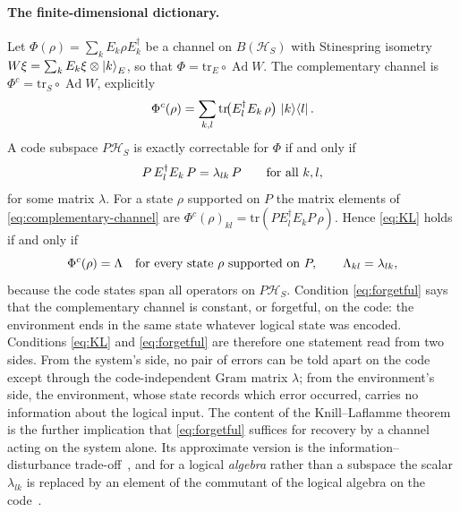 \documentclass[a4paper,11pt]{article}
\theoremstyle{definition}
\newcommand{\tr}{\text{tr}}
\newcommand{\Ad}{\operatorname{Ad}}
\begin{document}
\paragraph{The finite-dimensional dictionary.}
Let $\Phi(\rho)=\sum_kE_k\rho E_k^\dagger$ be a channel on $B(\mathcal H_S)$ with Stinespring isometry $W\xi=\sum_kE_k\xi\otimes\ket{k}_E$, so that $\Phi=\tr_E\circ\Ad W$. The complementary channel is $\Phi^c=\tr_S\circ\Ad W$, explicitly
\begin{equation}
 \Phi^c(\rho)=\sum_{k,l}\tr\!\bigl(E_l^\dagger E_k\,\rho\bigr)\,\ket{k}\!\bra{l}.
 \label{eq:complementary-channel}
\end{equation}
A code subspace $P\mathcal H_S$ is exactly correctable for $\Phi$ if and only if~\cite{KnillLaflamme1997}
\begin{equation}
 P\,E_l^\dagger E_k\,P=\lambda_{lk}\,P\qquad\hbox{for all }k,l,
 \label{eq:KL}
\end{equation}
for some matrix $\lambda$. For a state $\rho$ supported on $P$ the matrix elements of \eqref{eq:complementary-channel} are $\Phi^c(\rho)_{kl}=\tr(PE_l^\dagger E_kP\,\rho)$. Hence \eqref{eq:KL} holds if and only if
\begin{equation}
 \Phi^c(\rho)=\Lambda\quad\hbox{for every state $\rho$ supported on }P,\qquad\Lambda_{kl}=\lambda_{lk},
 \label{eq:forgetful}
\end{equation}
because the code states span all operators on $P\mathcal H_S$. Condition \eqref{eq:forgetful} says that the complementary channel is constant, or forgetful, on the code: the environment ends in the same state whatever logical state was encoded. Conditions \eqref{eq:KL} and \eqref{eq:forgetful} are therefore one statement read from two sides. From the system's side, no pair of errors can be told apart on the code except through the code-independent Gram matrix $\lambda$; from the environment's side, the environment, whose state records which error occurred, carries no information about the logical input. The content of the Knill--Laflamme theorem is the further implication that \eqref{eq:forgetful} suffices for recovery by a channel acting on the system alone. Its approximate version is the information--disturbance trade-off~\cite{SchumacherWestmoreland2002,KretschmannSchlingemannWerner2008}, and for a logical \emph{algebra} rather than a subspace the scalar $\lambda_{lk}$ is replaced by an element of the commutant of the logical algebra on the code~\cite{BenyKempfKribs2007}.
\end{document}
